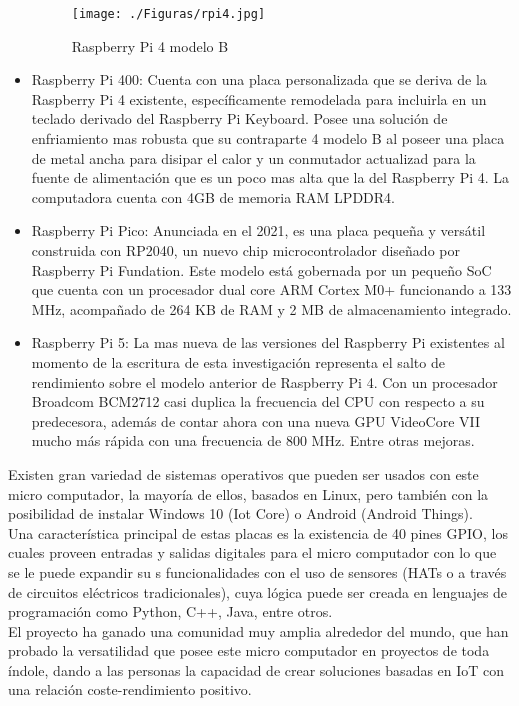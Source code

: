 \begin{itemize}
\begin{figure}[htb]
\centering
\texttt{[image: ./Figuras/rpi4.jpg]}
\caption{Raspberry Pi 4 modelo B}
\label{fig:rpi4}
\vspace*{-10pt}
\end{figure}

\item Raspberry Pi 400: Cuenta con una placa personalizada que se deriva de la Raspberry Pi 4 existente, específicamente remodelada para incluirla en un teclado derivado del Raspberry Pi Keyboard. Posee una solución de enfriamiento mas robusta que su contraparte 4 modelo B al poseer una placa de metal ancha para disipar el calor y un conmutador actualizad para la fuente de alimentación que es un poco mas alta que la del Raspberry Pi 4. La computadora cuenta con 4GB de memoria RAM LPDDR4.
\item Raspberry Pi Pico: Anunciada en el 2021, es una placa pequeña y versátil construida con RP2040, un nuevo chip microcontrolador diseñado por Raspberry Pi Fundation. Este modelo está gobernada por un pequeño SoC que cuenta con un procesador dual core ARM Cortex M0+ funcionando a 133 MHz, acompañado de 264 KB de RAM y 2 MB de almacenamiento integrado.
\item Raspberry Pi 5: La mas nueva de las versiones del Raspberry Pi existentes al momento de la escritura de esta investigación representa el salto de rendimiento sobre el modelo anterior de Raspberry Pi 4. Con un procesador  Broadcom BCM2712 casi duplica la frecuencia del CPU con respecto a su predecesora, además de contar ahora con una nueva GPU VideoCore VII mucho más rápida con una frecuencia de 800 MHz. Entre otras mejoras.
\end{itemize}
Existen gran variedad de sistemas operativos que pueden ser usados con este micro computador, la mayoría de ellos, basados en Linux, pero también con la posibilidad de instalar Windows 10 (Iot Core) o Android (Android Things).\\

Una característica principal de estas placas es la existencia de 40 pines GPIO, los cuales proveen entradas y salidas digitales para el micro computador con lo que se le puede expandir su s funcionalidades con el uso de sensores (HATs o a través de circuitos eléctricos tradicionales), cuya lógica puede ser creada en lenguajes de programación como Python, C++, Java, entre otros.\\

El proyecto ha ganado una comunidad muy amplia alrededor del mundo, que han probado la versatilidad que posee este micro computador en proyectos de toda índole, dando a las personas la capacidad de crear soluciones basadas en IoT con una relación coste-rendimiento positivo.

